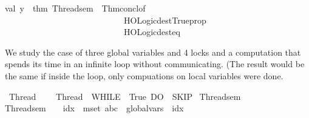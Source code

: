\begin{isabellebody}
val\ y\ {\isacharequal}{\kern0pt}\ {\isacharat}{\kern0pt}{\isacharbraceleft}{\kern0pt}thm\ Thread{}{\isacharunderscore}{\kern0pt}sem{\isacharbraceright}{\kern0pt}\ {\isacharbar}{\kern0pt}{\isachargreater}{\kern0pt}\ Thm{\isachardot}{\kern0pt}concl{\isacharunderscore}{\kern0pt}of\ \isanewline
\ \ \ \ \ \ \ \ \ \ \ \ \ \ \ \ \ \ \ \ \ \ \ \ \ \ \ {\isacharbar}{\kern0pt}{\isachargreater}{\kern0pt}\ HOLogic{\isachardot}{\kern0pt}dest{\isacharunderscore}{\kern0pt}Trueprop\ \isanewline
\ \ \ \ \ \ \ \ \ \ \ \ \ \ \ \ \ \ \ \ \ \ \ \ \ \ \ {\isacharbar}{\kern0pt}{\isachargreater}{\kern0pt}\ HOLogic{\isachardot}{\kern0pt}dest{\isacharunderscore}{\kern0pt}eq\isanewline
{\isacartoucheclose}%
\endisatagML
{\isafoldML}%
%
\isadelimML
%
\endisadelimML
%
\isadelimdocument
%
\endisadelimdocument
%
\isatagdocument
%
\isamarkuptrue%
%
\endisatagdocument
{\isafolddocument}%
%
\isadelimdocument
%
\endisadelimdocument
%
\begin{isamarkuptext}%
We study the case of three global variables and 4 locks 
and a computation that spends its time in an infinite loop without
communicating. (The result would be the same if inside the loop,
only compuations on local variables were done.%
\end{isamarkuptext}\isamarkuptrue%
\isamarkupfalse%
\ Thread{}\ \ \isanewline
\ \ {\isachardoublequoteopen}Thread{}\ {\isacharequal}{\kern0pt}\ WHILE\ {\isacharparenleft}{\kern0pt}{\isasymlambda}{\isasymsigma}{\isachardot}{\kern0pt}\ True{\isacharparenright}{\kern0pt}\ DO\ \ SKIP{\isachardoublequoteclose}\isanewline
\isanewline
{}\isamarkupfalse%
\ Thread{}{\isacharunderscore}{\kern0pt}sem\ \ \isanewline
{\isachardoublequoteopen}Thread{}{\isacharunderscore}{\kern0pt}sem\ {\isasymequiv}\ {\isacharparenleft}{\kern0pt}\ \isactrlbold {\isacharbar}{\kern0pt}\isactrlbold {\isacharbar}{\kern0pt}\isactrlbold {\isacharbar}{\kern0pt}\ idx\ {\isasymin}{\isacharhash}{\kern0pt}\ mset\ {\isacharbrackleft}{\kern0pt}{\isacharprime}{\kern0pt}{\isacharprime}{\kern0pt}a{\isacharprime}{\kern0pt}{\isacharprime}{\kern0pt}{\isacharcomma}{\kern0pt}{\isacharprime}{\kern0pt}{\isacharprime}{\kern0pt}b{\isacharprime}{\kern0pt}{\isacharprime}{\kern0pt}{\isacharcomma}{\kern0pt}{\isacharprime}{\kern0pt}{\isacharprime}{\kern0pt}c{\isacharprime}{\kern0pt}{\isacharprime}{\kern0pt}{\isacharbrackright}{\kern0pt}{\isachardot}{\kern0pt}\ \ global{\isacharunderscore}{\kern0pt}vars\ {\isasymsigma}\ idx\ \ \isanewline

\end{isabellebody}
